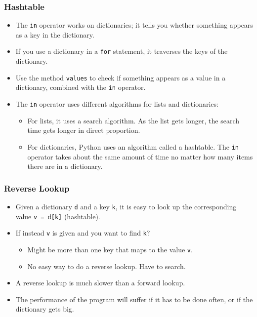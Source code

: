 \documentclass{beamer}
\newcommand{\beforeverb}{\footnotesize}
\newcommand{\afterverb}{\normalsize}
\begin{document}
\begin{frame}[fragile]
\frametitle{Hashtable}

\begin{itemize}
\item 
The {\tt in} operator works on dictionaries; it tells you whether
something appears as a \alert{key} in the dictionary.
\item If you use a dictionary in a {\tt for} statement, it traverses
the \alert{keys} of the dictionary. 
\item Use the method {\tt values} to check if something appears as a \alert{value} in a dictionary, combined with the {\tt in} operator.
%

\item The {\tt in} operator uses different algorithms for lists and
dictionaries:
\begin{itemize}
\item For lists, it uses a search algorithm.  As the list gets longer, the search time gets
longer in direct proportion.  
\item For dictionaries, Python uses an
algorithm called a \alert{hashtable}. The
{\tt in} operator takes about the \alert{same amount of time} no matter how
many items there are in a dictionary. 
\end{itemize}
\end{itemize}
\end{frame}
\begin{frame}[fragile]
\frametitle{Reverse Lookup}
\begin{itemize}
\item Given a dictionary {\tt d} and a key {\tt k}, it is easy to
look up the corresponding value {\tt v = d[k]} (hashtable). 
\item If instead {\tt v} is given and you want to find {\tt k}?
\begin{itemize}
\item Might be more than one
key that maps to the value {\tt v}. 
\item No easy way to do a \alert{reverse lookup}. Have to search.
\end{itemize}
\item A reverse lookup is \alert{much slower} than a forward lookup.
\item The performance
of the program will suffer if it has to be done often, or if the dictionary gets big.
\end{itemize}

\end{frame}
\end{document}

